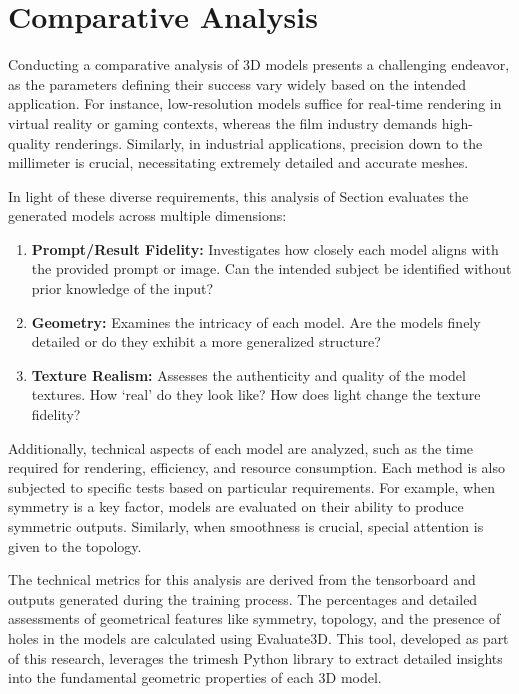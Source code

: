 \section{Comparative Analysis}\label{comparativeAnalysis}

Conducting a comparative analysis of 3D models presents a challenging endeavor, as the parameters defining their success vary widely based on the intended application. For instance, low-resolution models suffice for real-time rendering in virtual reality or gaming contexts, whereas the film industry demands high-quality renderings. Similarly, in industrial applications, precision down to the millimeter is crucial, necessitating extremely detailed and accurate meshes.

In light of these diverse requirements, this analysis of Section evaluates the generated models across multiple dimensions:

\begin{enumerate}
    \item \textbf{Prompt/Result Fidelity:} Investigates how closely each model aligns with the provided prompt or image. Can the intended subject be identified without prior knowledge of the input?
    \item \textbf{Geometry:} Examines the intricacy of each model. Are the models finely detailed or do they exhibit a more generalized structure?
    \item \textbf{Texture Realism:} Assesses the authenticity and quality of the model textures. How `real' do they look like? How does light change the texture fidelity?
\end{enumerate}

Additionally, technical aspects of each model are analyzed, such as the time required for rendering, efficiency, and resource consumption. Each method is also subjected to specific tests based on particular requirements. For example, when symmetry is a key factor, models are evaluated on their ability to produce symmetric outputs. Similarly, when smoothness is crucial, special attention is given to the topology.

The technical metrics for this analysis are derived from the tensorboard and outputs generated during the training process. The percentages and detailed assessments of geometrical features like symmetry, topology, and the presence of holes in the models are calculated using Evaluate3D. This tool, developed as part of this research, leverages the trimesh Python library \citep{trimesh} to extract detailed insights into the fundamental geometric properties of each 3D model.

